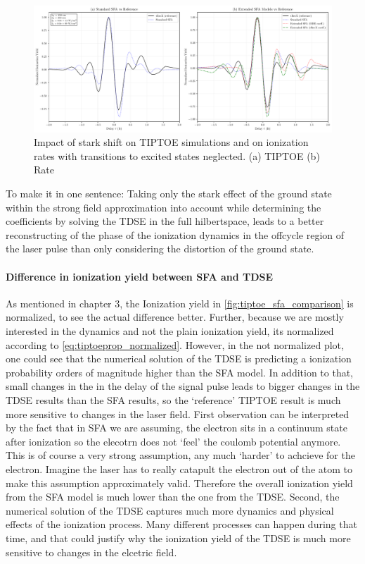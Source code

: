 \begin{figure}
    \centering
    \includegraphics[width=1\textwidth]{../ionModel/python/plotsTIPTOE/2plot_SFA-comparison_2.pdf}
    \caption[Impact of stark effect on TIPTOE simulations and ionization rates]{Impact of stark shift on TIPTOE simulations and on ionization rates with transitions to excited states neglected. 
            (a) TIPTOE
            (b) Rate}
    \label{fig:tiptoe_rate_stark}
\end{figure}




\medskip
To make it in one sentence:
Taking only the stark effect of the ground state within the strong field approximation into account while determining the coefficients by solving the TDSE in the full hilbertspace, leads to a better reconstructing of the phase of the ionization dynamics in the offcycle region of the laser pulse than only considering the distortion of the ground state.



\paragraph{Difference in ionization yield between SFA and TDSE}
As mentioned in chapter 3, the Ionization yield in \ref{fig:tiptoe_sfa_comparison} is normalized, to see the actual difference better.
Further, because we are mostly interested in the dynamics and not the plain ionization yield, its normalized according to \eqref{eq:tiptoeprop_normalized}.
However, in the not normalized plot, one could see that the numerical solution of the TDSE is predicting a ionization probability orders of magnitude higher than the SFA model.
In addition to that, small changes in the in the delay of the signal pulse leads to bigger changes in the TDSE results than the SFA results, so the `reference' TIPTOE result is much more sensitive to changes in the laser field.
First observation can be interpreted by the fact that in SFA we are assuming, the electron sits in a continuum state after ionization so the elecotrn does not `feel' the coulomb potential anymore.
This is of course a very strong assumption, any much `harder' to achcieve for the electron. 
Imagine the laser has to really catapult the electron out of the atom to make this assumption approximately valid.
Therefore the overall ionization yield from the SFA model is much lower than the one from the TDSE.
Second, the numerical solution of the TDSE captures much more dynamics and physical effects of the ionization process.
Many different processes can happen during that time, and that could justify why the ionization yield of the TDSE is much more sensitive to changes in the elcetric field.


